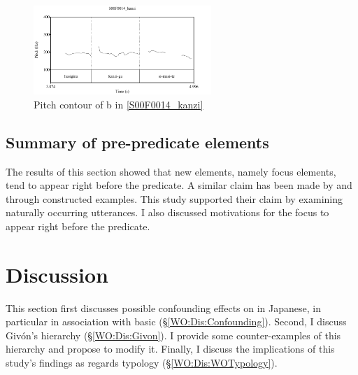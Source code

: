 \begin{figure}
	\begin{center}
	\includegraphics[width=0.6\textwidth]{sounds/S00F0014_kanzi.pdf}
	\caption{Pitch contour of b in \ref{S00F0014_kanzi}}
	\label{S00F0014_kanziF}
	\end{center}
\end{figure}

\subsection{Summary of pre-predicate elements}

The results of this section showed that
new elements, namely focus elements, tend to appear right before the predicate.
A similar claim has been made by  and 
through constructed examples.
This study supported their claim by examining naturally occurring utterances.
I also discussed motivations for the focus to appear right before the predicate.

\section{Discussion}\label{WODiscussion}

This section first discusses possible confounding effects on  in Japanese,
in particular in association with basic  (\S \ref{WO:Dis:Confounding}).
Second,
I discuss Giv{\'{o}}n's  hierarchy (\S \ref{WO:Dis:Givon}).
I provide some counter-examples of this hierarchy and
propose to modify it.
Finally, 
I discuss the implications of this study's findings as regards  typology (\S \ref{WO:Dis:WOTypology}).



